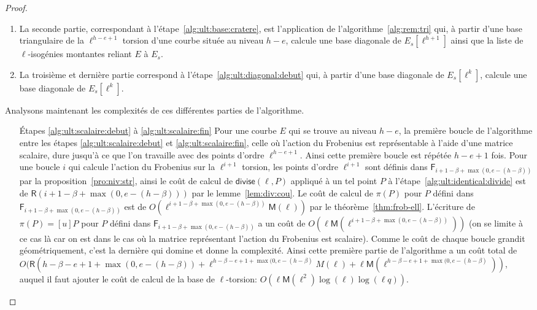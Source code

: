 \documentclass[10pt,a4paper]{book}
\theoremstyle{plain}
\theoremstyle{definition}
\theoremstyle{definition}
\theoremstyle{definition}
\theoremstyle{definition}
\theoremstyle{definition}
\theoremstyle{remark}
\theoremstyle{remark}
\theoremstyle{definition}
\begin{document}
\begin{proof}
\begin{enumerate}
\item La seconde partie, correspondant à l'étape~\ref{alg:ult:base:cratere}, est
l'application de l'algorithme~\ref{alg:rem:tri} qui, à partir d'une base 
triangulaire de la $\ell^{h-e+1}$ torsion d'une courbe située au niveau $h-e$,
calcule une base diagonale de $E_s[\ell^{h+1}]$ ainsi que la liste de
$\ell$-isogénies montantes reliant $E$ à $E_s$.
\item La troisième et dernière partie correspond à 
l'étape~\ref{alg:ult:diagonal:debut} qui, à partir d'une base diagonale de 
$E_s[\ell^k]$, calcule une base diagonale de $E_s[\ell^k]$.
\end{enumerate}
Analysons maintenant les complexités de ces différentes parties de 
l'algorithme.
\begin{enumerate}
\item[\'Etapes \ref{alg:ult:scalaire:debut} à \ref{alg:ult:scalaire:fin}]
Pour une courbe $E$ qui se trouve au niveau $h-e$, la première boucle de l'algorithme entre les étapes \ref{alg:ult:scalaire:debut} et \ref{alg:ult:scalaire:fin}, celle où l'action du 
Frobenius est représentable à l'aide d'une matrice scalaire, dure jusqu'à ce 
que l'on travaille avec des points d'ordre $\ell^{h-e+1}$. Ainsi cette première
 boucle est répétée $h-e+1$ fois. Pour une boucle $i$ qui calcule l'action du 
 Frobenius sur la $\ell^{i+1}$ torsion, les points d'ordre $\ell^{i+1}$ 
sont définis dans $\mathsf{F}_{i+1-\beta+\max(0,e-(h-\beta))}$ par la 
proposition~\ref{pro:niv:str}, ainsi le coût de calcul de 
$\mathsf{divise}(\ell,P)$ appliqué à un tel point $P$ à 
l'étape~\ref{alg:ult:identical:divide} est de $\mathsf{R}(i+1-\beta+\max(0,e-
(h-\beta)))$ par le lemme~\ref{lem:div:cou}. Le coût de calcul de $\pi(P)$ pour
$P$ défini dans $\mathsf{F}_{i+1-\beta+\max(0,e-(h-\beta))}$ est de 
$O(\ell^{i+1-\beta+\max(0,e-(h-\beta))}\mathsf{M}(\ell))$ par le 
théorème~\ref{thm:frob-ell}. L'écriture de $\pi(P)=[u]P$ pour $P$ défini dans 
$\mathsf{F}_{i+1-\beta+\max(0,e-(h-\beta))}$
a un coût de $O(\ell \mathsf{M}(\ell^{i+1- \beta+\max(0,e-(h-\beta))}))$
(on se limite à ce cas là car on est dans le cas où la matrice représentant 
l'action du Frobenius est scalaire). Comme le coût de chaque boucle grandit 
géométriquement, c'est la dernière qui domine et donne la 
complexité. Ainsi cette première partie de l'algorithme a un coût 
 total de $O(\mathsf{R}(h-\beta-e+1 +\max(0,e-(h-\beta))+\ell^{h-\beta-e+1+
\max(0,e-(h-\beta)}M(\ell)+\ell\mathsf{M}(\ell^{h-\beta-e+1+
\max(0,e-(h-\beta)}))$, auquel il faut ajouter le coût de calcul de la base de 
$\ell$-torsion: $O(\ell\mathsf{M}(\ell^2)\log(\ell)\log(\ell q))$.


\end{enumerate}
\end{proof}
\end{document}
